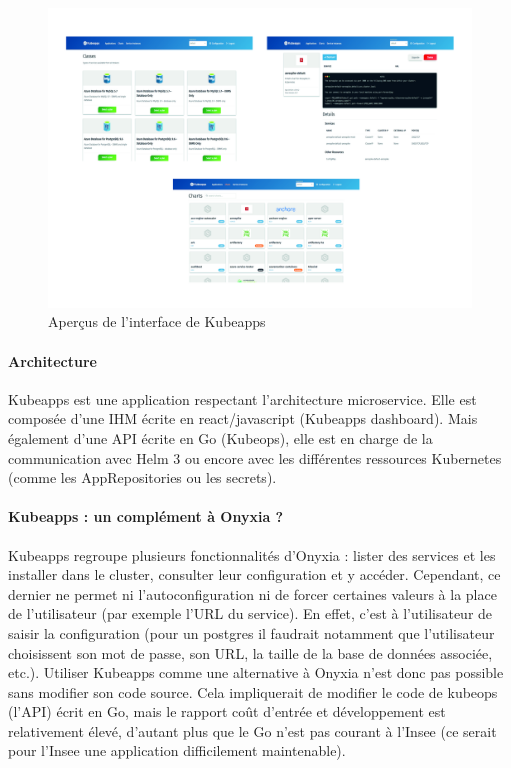 \documentclass[11pt,fleqn]{book} %
\begin{document}
\begin{figure}[H]\centering
\renewcommand{\figurename}{Capture d'écran}
\hspace{-1cm}
\includegraphics[scale=0.10]{Pictures/onyxia/kubeapps.jpg}
\captionsetup{margin=1.5cm,format=hang,justification=justified}
\caption[]{Aperçus de l'interface de Kubeapps \newline}
\end{figure}

\paragraph{Architecture}
Kubeapps est une application respectant l'architecture microservice. Elle est composée d'une IHM écrite en react/javascript (Kubeapps dashboard). Mais également d'une API écrite en Go (Kubeops), elle est en charge de la communication avec Helm 3 ou encore avec les différentes ressources Kubernetes (comme les AppRepositories ou les secrets).\\

\paragraph{Kubeapps : un complément à Onyxia ?}
Kubeapps regroupe plusieurs fonctionnalités d'Onyxia : lister des services et les installer dans le cluster, consulter leur configuration et y accéder. Cependant, ce dernier ne permet ni l'autoconfiguration ni de forcer certaines valeurs à la place de l'utilisateur (par exemple l'URL du service). En effet, c'est à l'utilisateur de saisir la configuration (pour un postgres il faudrait notamment que l'utilisateur choisissent son mot de passe, son URL, la taille de la base de données associée, etc.). Utiliser Kubeapps comme une alternative à Onyxia n'est donc pas possible sans modifier son code source. Cela impliquerait de modifier le code de kubeops (l'API) écrit en Go, mais le rapport coût d'entrée et développement est relativement élevé, d'autant plus que le Go n'est pas courant à l'Insee (ce serait pour l'Insee une application difficilement maintenable).\newline
\end{document}
